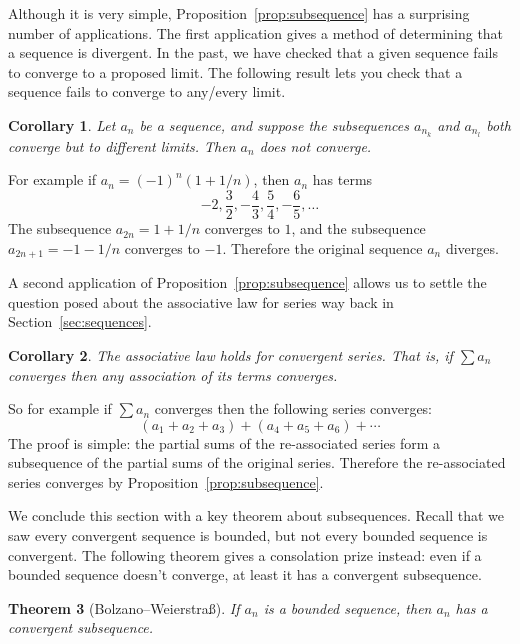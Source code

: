 \documentclass[11pt,oneside]{amsbook}
\theoremstyle{definition}
\theoremstyle{plain}
\newtheorem{thm}{Theorem}[section]
\newtheorem{cor}[thm]{Corollary}
\theoremstyle{definition}
\theoremstyle{remark}
\numberwithin{equation}{section}
\numberwithin{figure}{section}
\begin{document}
Although it is very simple, Proposition~\ref{prop:subsequence} has a surprising number of applications. The first application gives a method of determining that a sequence is divergent. In the past, we have checked that a given sequence fails to converge to a proposed limit. The following result lets you check that a sequence fails to converge to any/every limit.

\begin{cor}
  \label{cor:divergence}
  Let $a_n$ be a sequence, and suppose the subsequences $a_{n_k}$ and $a_{n_l}$ both converge but to different limits. Then $a_n$ does not converge.
\end{cor}

For example if $a_n=(-1)^n(1+1/n)$, then $a_n$ has terms
\[-2,\frac32,-\frac{4}{3},\frac54,-\frac{6}{5},\ldots
\]
The subsequence $a_{2n}=1+1/n$ converges to $1$, and the subsequence $a_{2n+1}=-1-1/n$ converges to $-1$. Therefore the original sequence $a_n$ diverges.

A second application of Proposition~\ref{prop:subsequence} allows us to settle the question posed about the associative law for series way back in Section~\ref{sec:sequences}.

\begin{cor}
  The associative law holds for convergent series. That is, if $\sum a_n$ converges then any association of its terms converges.
\end{cor}

So for example if $\sum a_n$ converges then the following series converges:
\[(a_1+a_2+a_3)+(a_4+a_5+a_6)+\cdots
\]
The proof is simple: the partial sums of the re-associated series form a subsequence of the partial sums of the original series. Therefore the re-associated series converges by Proposition~\ref{prop:subsequence}.

We conclude this section with a key theorem about subsequences. Recall that we saw every convergent sequence is bounded, but not every bounded sequence is convergent. The following theorem gives a consolation prize instead: even if a bounded sequence doesn't converge, at least it has a convergent subsequence.

\begin{thm}[Bolzano--Weierstra\ss]
  If $a_n$ is a bounded sequence, then $a_n$ has a convergent subsequence.
\end{thm}
\end{document}
